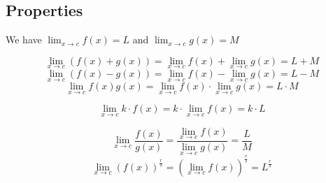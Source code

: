 \documentclass{article}
\begin{document}
\subsection{Properties}

We have \(\lim_{x \to c} f(x) = L\) and \(\lim_{x \to c} g(x) = M\)

\[
\lim_{x \to c} \left(f(x) + g(x)\right) = \lim_{x \to c} f(x) + \lim_{x \to c} g(x) = L + M
\]\[
\lim_{x \to c} \left(f(x) - g(x)\right) = \lim_{x \to c} f(x) - \lim_{x \to c} g(x) = L - M
\]
\[
\lim_{x \to c} f(x)g(x) = \lim_{x \to c} f(x) \cdot \lim_{x \to c} g(x) = L \cdot M
\]

\[
\lim_{x \to c} k \cdot f(x) = k \cdot \lim_{x \to c} f(x) = k \cdot L
\]

\[
\lim_{x \to c} \frac{f(x)}{g(x)} = \frac{\lim_{x \to c} f(x)}{\lim_{x \to c} g(x)} = \frac{L}{M}
\]
\[
  \lim_{x \to c} \left(f(x)\right)^{\frac{r}{s}} = \left(\lim_{x \to c} f(x)\right)^\frac{r}{s} = L^\frac{r}{s}
\]
\end{document}
